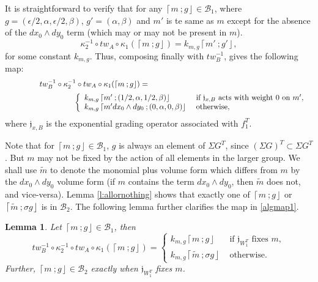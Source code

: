 \documentclass[10pt, letterpaper]{amsart}
\newtheorem{lem}[thm]{Lemma}
\theoremstyle{remark}
\newtheorem{rem}{Remark}[thm]
\newcommand{\sB}{\mathscr{B}}
\newcommand{\fjrw}[2]{ \left\lceil #1 \:; #2 \right\rfloor }
\newcommand{\jw}{\mathfrak{j}}
\newcommand{\s}[1]{\Sigma #1}
\begin{document}
It is straightforward to verify that for any $\fjrw{m}{g} \in \sB_1 $, where $g = (\epsilon/2, \alpha, \epsilon/2, \beta)$, $g' = (\alpha, \beta)$ and $m'$ is te same as $m$ except for the absence of the $dx_0 \wedge dy_0$ term (which may or may not be present in $m$). 
\[ \kappa_2^{-1} \circ tw_A \circ \kappa_1 \left( \fjrw{m}{g}\right) = k_{m,g} \fjrw{m'}{g'},\]
 for some constant $k_{m,g}$.  Thus, composing finally with  $tw_B^{-1}$, gives the following map: 
\begin{equation}\label{algmap1}
\begin{array}{c}
tw_B^{-1}\circ \kappa_2^{-1} \circ tw_A \circ \kappa_1(\fjrw{m}{g})=\hspace*{6cm}\\ [2mm]
\hspace*{3cm}\left\{ \begin{array}{ll}
k_{{m},{g}}\fjrw{m'}{(1/2, \alpha, 1/2, \beta)} &  \text{ if }\jw_{x,B}\text{ acts with weight 0 on }m',\\
k_{{m},{g}}\fjrw{m'dx_0 \wedge dy_0}{(0, \alpha, 0, \beta)} & \text{ otherwise}, \end{array}\right.
 \end{array}
 \end{equation}
 where $\jw_{x,B}$ is the exponential grading operator associated with $f_1^T$. %

Note that for $\fjrw{m}{g}\in \sB_1$,  $g$ is always an element of $\s{G^T}$, since $(\s{G})^T\subset \s{G^T}$. But $m$ may not be fixed by the action of all elements in the larger group.  We shall use $\tilde{m}$ to denote the monomial plus volume form which  differs from $m$ by the $dx_0\wedge dy_0$ volume form (if $m$ contains the term $dx_0\wedge dy_0$, then $\tilde{m}$ does not, and vice-versa). 
Lemma \ref{l:allornothing} shows that exactly one of $\fjrw{m}{g}$ or $\fjrw{\tilde m}{\sigma g}$ is in $\sB_2$.  The following lemma further clarifies the map in \autoref{algmap1}.

\begin{lem}
Let $\fjrw{m}{g} \in \sB_1$, then 
\[
tw_B^{-1}\circ \kappa_2^{-1} \circ tw_A \circ \kappa_1(\fjrw{m}{g})= \left\{ \begin{array}{ll}
k_{m,g}\fjrw{m}{g} &  \text{ if }\jw_{W_1^T}\text{ fixes }m,\\
 k_{m,g}\fjrw{\tilde{m}}{\sigma{g}} & \text{ otherwise}. \end{array}\right.
 \]
Further, $\fjrw{m}{g} \in \sB_2$ exactly when $\jw_{W_1^T}$ fixes $m$. 
\end{lem} 
\end{document}
